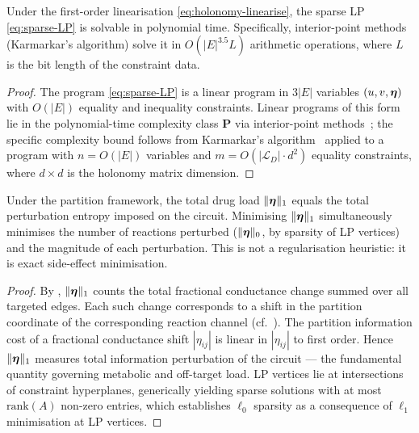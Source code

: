 \begin{theorem}
\label{thm:polynomial-time}
Under the first-order linearisation \eqref{eq:holonomy-linearise}, the
sparse LP \eqref{eq:sparse-LP} is solvable in polynomial time.
Specifically, interior-point methods (Karmarkar's algorithm) solve it in
$O(|E|^{3.5} L)$ arithmetic operations, where $L$ is the bit length of the
constraint data.
\end{theorem}

\begin{proof}
The program \eqref{eq:sparse-LP} is a linear program in $3|E|$ variables
$(u, v, \boldsymbol{\eta})$ with $O(|E|)$ equality and inequality constraints.
Linear programs of this form lie in the polynomial-time complexity class
$\mathbf{P}$ via interior-point methods~\citep{Karmarkar1984}; the specific complexity bound follows
from Karmarkar's algorithm~\citep{Karmarkar1984} applied to a program with $n = O(|E|)$ variables and
$m = O(|\mathcal{L}_D|\cdot d^2)$ equality constraints, where $d \times d$ is
the holonomy matrix dimension.
\end{proof}

\begin{proposition}
\label{prop:l1-sideeffect}
Under the partition framework, the total drug load $\|\boldsymbol{\eta}\|_1$ equals the
total perturbation entropy imposed on the circuit.  Minimising $\|\boldsymbol{\eta}\|_1$
simultaneously minimises the number of reactions perturbed ($\|\boldsymbol{\eta}\|_0$,
by sparsity of LP vertices) and the magnitude of each perturbation.  This is
not a regularisation heuristic: it is exact side-effect minimisation.
\end{proposition}

\begin{proof}
By , $\|\boldsymbol{\eta}\|_1$ counts the total fractional
conductance change summed over all targeted edges.  Each such change corresponds
to a shift in the partition coordinate of the corresponding reaction channel
(cf.\ ).  The partition information cost of a
fractional conductance shift $|\eta_{ij}|$ is linear in $|\eta_{ij}|$ to
first order.  Hence $\|\boldsymbol{\eta}\|_1$ measures total information perturbation
of the circuit — the fundamental quantity governing metabolic and off-target
load.  LP vertices lie at intersections of constraint hyperplanes, generically
yielding sparse solutions with at most $\mathrm{rank}(A)$ non-zero entries,
which establishes $\ell_0$ sparsity as a consequence of $\ell_1$ minimisation
at LP vertices.
\end{proof}

